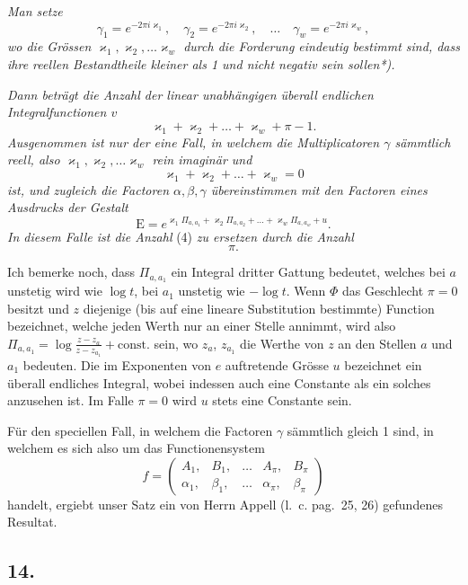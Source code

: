 \documentclass{article}
\begin{document}
\emph{Man setze}
\[
\gamma_1 = e^{-2\pi i\varkappa_1}, \quad \gamma_2 = e^{-2\pi i\varkappa_2}, \quad \dots \quad \gamma_w = e^{-2\pi i\varkappa_w}, \tag{3}
\]
\emph{wo die Grössen $\varkappa_1, \varkappa_2, \dots \varkappa_w$ durch die Forderung eindeutig bestimmt sind, dass ihre reellen Bestandtheile kleiner als 1 und nicht negativ sein sollen*).}

\emph{Dann beträgt die Anzahl der linear unabhängigen überall endlichen Integralfunctionen $v$}
\[
\varkappa_1 + \varkappa_2 + \dots + \varkappa_w + \pi - 1. \tag{4}
\]
\emph{Ausgenommen ist nur der eine Fall, in welchem die Multiplicatoren $\gamma$ sämmtlich reell, also $\varkappa_1, \varkappa_2, \dots \varkappa_w$ rein imaginär und}
\[
\varkappa_1 + \varkappa_2 + \dots + \varkappa_w = 0
\]
\emph{ist, und zugleich die Factoren $\alpha, \beta, \gamma$ übereinstimmen mit den Factoren eines Ausdrucks der Gestalt}
\[
\mathrm{E} = e^{\varkappa_1 \Pi_{a, a_1} + \varkappa_2 \Pi_{a, a_2} + \dots + \varkappa_w \Pi_{a, a_w} + u}.
\]
\emph{In diesem Falle ist die Anzahl} (4) \emph{zu ersetzen durch die Anzahl}
\[
\pi. \tag{5}
\]

Ich bemerke noch, dass $\Pi_{a, a_1}$ ein Integral dritter Gattung bedeutet, welches bei $a$ unstetig wird wie $\log t$, bei $a_1$ unstetig wie $-\log t$. Wenn $\Phi$ das Geschlecht $\pi = 0$ besitzt und $z$ diejenige (bis auf eine lineare Substitution bestimmte) Function bezeichnet, welche jeden Werth nur an einer Stelle annimmt, wird also $\Pi_{a, a_1} = \log\frac{z - z_a}{z - z_{a_1}} + \text{const.}$ sein, wo $z_a$, $z_{a_1}$ die Werthe von $z$ an den Stellen $a$ und $a_1$ bedeuten. Die im Exponenten von $e$ auftretende Grösse $u$ bezeichnet ein überall endliches Integral, wobei indessen auch eine Constante als ein solches anzusehen ist. Im Falle $\pi = 0$ wird $u$ stets eine Constante sein.

Für den speciellen Fall, in welchem die Factoren $\gamma$ sämmtlich gleich 1 sind, in welchem es sich also um das Functionensystem
\[
f = \begin{pmatrix}
A_1, & B_1, & \dots & A_\pi, & B_\pi \\
\alpha_1, & \beta_1, & \dots & \alpha_\pi, & \beta_\pi
\end{pmatrix}
\]
handelt, ergiebt unser Satz ein von Herrn Appell (l.~c. pag.~25, 26) gefundenes Resultat.

\subsection*{14.}
\end{document}
